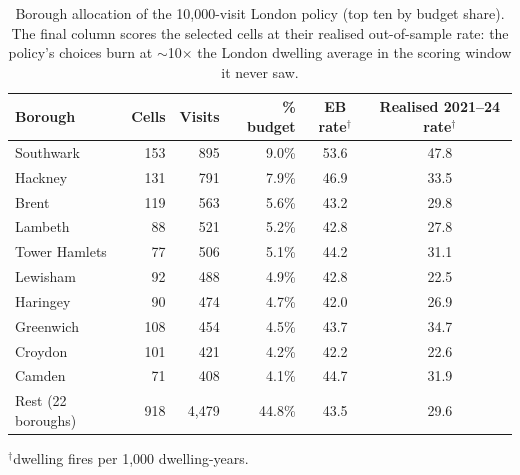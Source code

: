 \documentclass[11pt]{article}
\begin{document}
\begin{table}[htbp]
  \centering
  \caption{Borough allocation of the 10{,}000-visit London policy (top ten by
  budget share). The final column scores the selected cells at their realised
  out-of-sample rate: the policy's choices burn at $\sim$10$\times$ the London
  dwelling average in the scoring window it never saw.}
  \label{tab:boroughs}
  \small
  \begin{tabular}{@{}lrrrcc@{}}
    \toprule
    Borough & Cells & Visits & \% budget &
    EB rate$^{\dagger}$ & Realised 2021--24 rate$^{\dagger}$ \\
    \midrule
    Southwark     & 153 & 895 & 9.0\% & 53.6 & 47.8 \\
    Hackney       & 131 & 791 & 7.9\% & 46.9 & 33.5 \\
    Brent         & 119 & 563 & 5.6\% & 43.2 & 29.8 \\
    Lambeth       &  88 & 521 & 5.2\% & 42.8 & 27.8 \\
    Tower Hamlets &  77 & 506 & 5.1\% & 44.2 & 31.1 \\
    Lewisham      &  92 & 488 & 4.9\% & 42.8 & 22.5 \\
    Haringey      &  90 & 474 & 4.7\% & 42.0 & 26.9 \\
    Greenwich     & 108 & 454 & 4.5\% & 43.7 & 34.7 \\
    Croydon       & 101 & 421 & 4.2\% & 42.2 & 22.6 \\
    Camden        &  71 & 408 & 4.1\% & 44.7 & 31.9 \\
    Rest (22 boroughs) & 918 & 4{,}479 & 44.8\% & 43.5 & 29.6 \\
    \bottomrule
  \end{tabular}

  \smallskip
  {\footnotesize $^{\dagger}$dwelling fires per 1{,}000 dwelling-years.}
\end{table}
\end{document}
